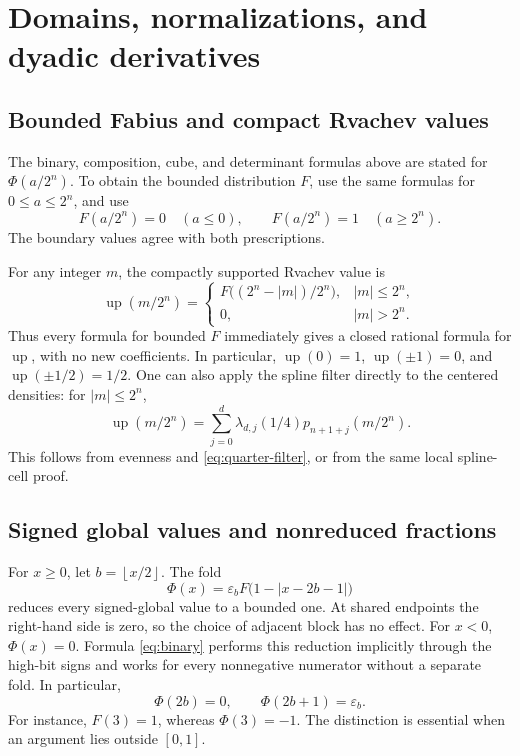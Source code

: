 \documentclass[11pt,a4paper]{article}
\theoremstyle{definition}
\theoremstyle{remark}
\newcommand{\Up}{\operatorname{up}}
\newcommand{\eps}{\varepsilon}
\newcommand{\floor}[1]{\left\lfloor #1\right\rfloor}
\begin{document}
\section{Domains, normalizations, and dyadic derivatives}
\label{sec:domains}
\subsection{Bounded Fabius and compact Rvachev values}
The binary, composition, cube, and determinant formulas above are stated for
\(\Phi(a/2^n)\).  To obtain the bounded distribution \(F\), use the same formulas
for \(0\leq a\leq2^n\), and use
\begin{equation}
 F(a/2^n)=0\quad(a\leq0),\qquad
 F(a/2^n)=1\quad(a\geq2^n).                             \label{eq:clamp}
\end{equation}
The boundary values agree with both prescriptions.

For any integer \(m\), the compactly supported Rvachev value is
\begin{equation}
 \boxed{\displaystyle
 \Up(m/2^n)=
 \begin{cases}
  F\bigl((2^n-|m|)/2^n\bigr),&|m|\leq2^n,\\
  0,&|m|>2^n.
 \end{cases}}                                               \label{eq:up-dyadic}
\end{equation}
Thus every formula for bounded \(F\) immediately gives a closed rational formula
for \(\Up\), with no new coefficients.  In particular,
\(\Up(0)=1\), \(\Up(\pm1)=0\), and \(\Up(\pm1/2)=1/2\).
One can also apply the spline filter directly to the centered densities:
for \(|m|\leq2^n\),
\[
 \Up(m/2^n)=\sum_{j=0}^{d}\lambda_{d,j}(1/4)
                  p_{n+1+j}(m/2^n).
\]
This follows from evenness and \eqref{eq:quarter-filter}, or from the same local
spline-cell proof.

\subsection{Signed global values and nonreduced fractions}
For \(x\geq0\), let \(b=\floor{x/2}\).  The fold
\begin{equation}
 \Phi(x)=\eps_b F\bigl(1-|x-2b-1|\bigr)                \label{eq:global-fold-final}
\end{equation}
reduces every signed-global value to a bounded one.  At shared endpoints the
right-hand side is zero, so the choice of adjacent block has no effect.
For \(x<0\), \(\Phi(x)=0\).
Formula \eqref{eq:binary} performs this reduction implicitly through the high-bit
signs and works for every nonnegative numerator without a separate fold.
In particular,
\begin{equation}
 \Phi(2b)=0,\qquad \Phi(2b+1)=\eps_b.                  \label{eq:integer-values}
\end{equation}
For instance, \(F(3)=1\), whereas \(\Phi(3)=-1\).  The distinction is essential
when an argument lies outside \([0,1]\).
\end{document}
